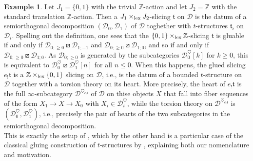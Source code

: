 \documentclass{article}
\theoremstyle{definition}
\newtheorem{exmp}[thm]{Example}
\newcommand{\Z}{\mathbb{Z}}
\newcommand{\tee}{\mathfrak{t}}
\newcommand{\orth}{\boxslash}
\newcommand{\lex}{\times_{\textnormal{lex}}}
\begin{document}
\begin{exmp}\label{example:bbd} Let $J_1=\{0,1\}$ with the trivial $\Z$-action and let $J_2=\Z$ with the standard translation $\Z$-action.  Then a $J_1\lex J_2$-slicing $\tee$ on $\mathscr{D}$ is the datum of a semiorthogonal decomposition $(\mathscr{D}_0,\mathscr{D}_1)$ of $\mathscr{D}$ toghether with $t$-structures $\tee_i$ on $\mathscr{D}_i$. Spelling out the definition, one sees that the $\{0,1\}\lex \Z$-slicing $\tee$ is gluable if and only if 
$\mathscr{D}_{0;\geq 0}\orth \mathscr{D}_{1;-1}$ and $\mathscr{D}_{0;\geq 0}\orth \mathscr{D}_{1;0}$, and so if and only if $\mathscr{D}_{0;\geq 0}\orth \mathscr{D}_{1;0}$. {\color{red}As  $\mathscr{D}_{0;\geq 0}$ is generated by the subcategories $\mathscr{D}_{0}^\heartsuit[k]$ for $k\geq 0$, this is equivalent to $\mathscr{D}_{0}^\heartsuit\orth\mathscr{D}_{1}^\heartsuit[n]$ for all $n\leq 0$.} When this happens, the glued slicing $e_!\tee$ is a $\Z\lex\{0,1\}$ slicing on $\mathscr{D}$, i.e., is the datum of a bounded $t$-structure on $\mathscr{D}$ together with a torsion theory on its heart. More precisely, the heart of $e_!\tee$ is the full $\infty$-subcategory $\mathscr{D}^{\heartsuit_{e_!\tee}}$ of $\mathscr{D}$ on thise objects $X$ that fall into fiber sequences of the form $X_1\to X\to X_0$ with $X_i\in \mathscr{D}_i^\heartsuit$, while the torsion theory on $\mathscr{D}^{\heartsuit_{e_!\tee}}$ is
  $(\mathscr{D}_0^{\heartsuit},\mathscr{D}_1^{\heartsuit})$, i.e., precisely the pair of hearts of the two subcategories in the semiorthogonal decomposition. \\
  This is exactly the setup of \cite{collins}, which by the other hand is a particular case of the classical gluing construction of $t$-structures by \cite{bbd}, explaining both our nomenclature and motivation.
\end{exmp}
\end{document}
